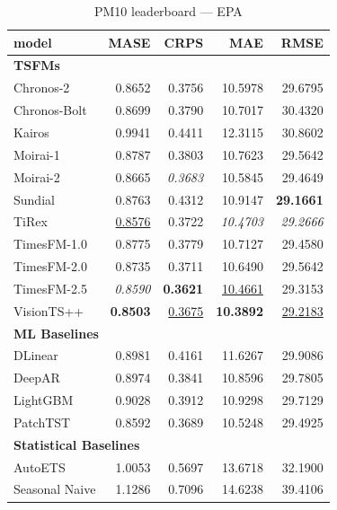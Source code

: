 \begin{table}[H]
\caption{PM10 leaderboard --- EPA}
\centering
\begin{small}
\begin{tabular}{lrrrr}
\toprule
model & MASE & CRPS & MAE & RMSE \\
\midrule
\multicolumn{5}{l}{\textbf{TSFMs}} \\
Chronos-2 & 0.8652 & 0.3756 & 10.5978 & 29.6795 \\
Chronos-Bolt & 0.8699 & 0.3790 & 10.7017 & 30.4320 \\
Kairos & 0.9941 & 0.4411 & 12.3115 & 30.8602 \\
Moirai-1 & 0.8787 & 0.3803 & 10.7623 & 29.5642 \\
Moirai-2 & 0.8665 & \textit{0.3683} & 10.5845 & 29.4649 \\
Sundial & 0.8763 & 0.4312 & 10.9147 & \textbf{29.1661} \\
TiRex & \underline{0.8576} & 0.3722 & \textit{10.4703} & \textit{29.2666} \\
TimesFM-1.0 & 0.8775 & 0.3779 & 10.7127 & 29.4580 \\
TimesFM-2.0 & 0.8735 & 0.3711 & 10.6490 & 29.5642 \\
TimesFM-2.5 & \textit{0.8590} & \textbf{0.3621} & \underline{10.4661} & 29.3153 \\
VisionTS++ & \textbf{0.8503} & \underline{0.3675} & \textbf{10.3892} & \underline{29.2183} \\
\midrule
\multicolumn{5}{l}{\textbf{ML Baselines}} \\
DLinear & 0.8981 & 0.4161 & 11.6267 & 29.9086 \\
DeepAR & 0.8974 & 0.3841 & 10.8596 & 29.7805 \\
LightGBM & 0.9028 & 0.3912 & 10.9298 & 29.7129 \\
PatchTST & 0.8592 & 0.3689 & 10.5248 & 29.4925 \\
\midrule
\multicolumn{5}{l}{\textbf{Statistical Baselines}} \\
AutoETS & 1.0053 & 0.5697 & 13.6718 & 32.1900 \\
Seasonal Naive & 1.1286 & 0.7096 & 14.6238 & 39.4106 \\
\bottomrule
\end{tabular}
\end{small}
\end{table}
